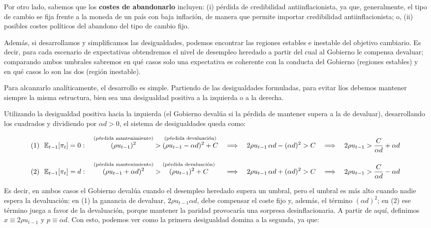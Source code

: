 \documentclass[10pt,a4paper]{article}
\begin{document}
Por otro lado, sabemos que los \textbf{costes de abandonarlo} incluyen: (i) pérdida de credibilidad antiinflacionista, ya que, generalmente, el tipo de cambio se fija frente a la moneda de un país con baja inflación, de manera que permite importar credibilidad antiinflacionista; o, (ii) posibles costes políticos del abandono del tipo de cambio fijo.

Además, si desarrollamos y simplificamos las desigualdades, podemos encontrar las regiones estables e inestable del objetivo cambiario. Es decir, para cada escenario de expectativas obtendremos el nivel de desempleo heredado a partir del cual al Gobierno le compensa devaluar; comparando ambos umbrales sabremos en qué casos solo una expectativa es coherente con la conducta del Gobierno (regiones estables) y en qué casos lo son las dos (región inestable).

Para alcanzarlo analíticamente, el desarrollo es simple. Partiendo de las desigualdades formuladas, para evitar líos debemos mantener siempre la misma estructura, bien sea una desigualdad positiva a la izquierda o a la derecha.

Utilizando la desigualdad positiva hacia la izquierda (el Gobierno devalúa si la pérdida de mantener supera a la de devaluar), desarrollando los cuadrados y dividiendo por $\alpha d>0$, el sistema de desigualdades queda como:

$$\begin{aligned}
    &(1)\ \ \mathbb E_{t-1}[\pi_t]=0:\quad \overset{\text{\scriptsize (pérdida mantenimiento)}}{(\rho u_{t-1})^2}>\overset{\text{\scriptsize (pérdida devaluación)}}{(\rho u_{t-1}-\alpha d)^2+C}&&\Longrightarrow\quad 2\rho u_{t-1}\,\alpha d-(\alpha d)^2>C&&\Longrightarrow\quad 2\rho u_{t-1}>\frac{C}{\alpha d}+\alpha d\\[1em]
    &(2)\ \ \mathbb E_{t-1}[\pi_t]=d:\quad \overset{\text{\scriptsize (pérdida mantenimiento)}}{(\rho u_{t-1}+\alpha d)^2}>\overset{\text{\scriptsize (pérdida devaluación)}}{(\rho u_{t-1})^2+C}&&\Longrightarrow\quad 2\rho u_{t-1}\,\alpha d+(\alpha d)^2>C&&\Longrightarrow\quad 2\rho u_{t-1}>\frac{C}{\alpha d}-\alpha d
\end{aligned}$$

Es decir, en ambos casos el Gobierno devalúa cuando el desempleo heredado supera un umbral, pero el umbral es más alto cuando nadie espera la devaluación: en (1) la ganancia de devaluar, $2\rho u_{t-1}\alpha d$, debe compensar el coste fijo y, además, el término $(\alpha d)^2$; en (2) ese término juega a favor de la devaluación, porque mantener la paridad provocaría una sorpresa desinflacionaria. A partir de aquí, definimos $x\equiv 2\rho u_{t-1}$ y $p\equiv \alpha d$. Con esto, podemos ver como la primera desigualdad domina a la segunda, ya que:
\end{document}
